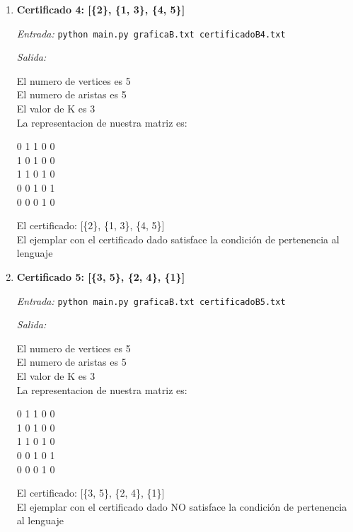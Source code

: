 \documentclass[12pt,letterpaper]{article}
\begin{document}
\begin{itemize}
\begin{itemize}
\begin{enumerate}
            \newpage
            \item \textbf{Certificado 4: [\{2\}, \{1, 3\}, \{4, 5\}]}
            
            \textit{Entrada:}
            \texttt{python main.py graficaB.txt certificadoB4.txt}
            
            \textit{Salida:}

            El numero de vertices es 5 \\ 
            El numero de aristas es 5 \\ 
            El valor de K es 3 \\ 
            La representacion de nuestra matriz es:
            \begin{center}
                0 1 1 0 0 \\ 
                1 0 1 0 0 \\ 
                1 1 0 1 0 \\ 
                0 0 1 0 1 \\ 
                0 0 0 1 0 \\ 
            \end{center}
            El certificado: [\{2\}, \{1, 3\}, \{4, 5\}] \\ 
            El ejemplar con el certificado dado satisface la condición
            de pertenencia al lenguaje
            
            \item \textbf{Certificado 5: [\{3, 5\}, \{2, 4\}, \{1\}]}
            
            \textit{Entrada:}
            \texttt{python main.py graficaB.txt certificadoB5.txt}
            
            \textit{Salida:}

            El numero de vertices es 5 \\
            El numero de aristas es 5 \\
            El valor de K es 3 \\
            La representacion de nuestra matriz es:
            \begin{center}
                0 1 1 0 0 \\
                1 0 1 0 0 \\
                1 1 0 1 0 \\
                0 0 1 0 1 \\
                0 0 0 1 0 \\
            \end{center}
            El certificado: [\{3, 5\}, \{2, 4\}, \{1\}] \\ 
            El ejemplar con el certificado dado NO satisface la condición
            de pertenencia al lenguaje
        \end{enumerate}
        

\end{itemize}
\end{itemize}
\end{document}
